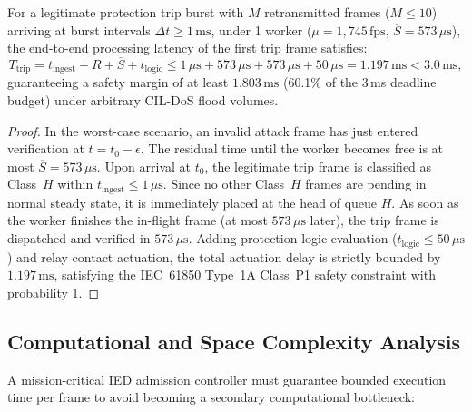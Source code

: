\documentclass{ieeeaccess}
\begin{document}
\begin{theorem}
\label{thm:deadline}
For a legitimate protection trip burst with $M$ retransmitted frames ($M \le 10$) arriving at burst intervals $\Delta t \ge 1\,\text{ms}$, under 1 worker ($\mu = 1{,}745\,\text{fps}$, $\overline{S} = 573\,\mu\text{s}$), the end-to-end processing latency of the first trip frame satisfies:
\begin{equation}
T_{\text{trip}} = t_{\text{ingest}} + R + \overline{S} + t_{\text{logic}} \le 1\,\mu\text{s} + 573\,\mu\text{s} + 573\,\mu\text{s} + 50\,\mu\text{s} = 1.197\,\text{ms} < 3.0\,\text{ms},
\end{equation}
guaranteeing a safety margin of at least $1.803\,\text{ms}$ (60.1\% of the 3\,ms deadline budget) under arbitrary CIL-DoS flood volumes.
\end{theorem}

\begin{proof}
In the worst-case scenario, an invalid attack frame has just entered verification at $t = t_0 - \epsilon$. The residual time until the worker becomes free is at most $\overline{S} = 573\,\mu\text{s}$. Upon arrival at $t_0$, the legitimate trip frame is classified as Class~$H$ within $t_{\text{ingest}} \le 1\,\mu\text{s}$. Since no other Class~$H$ frames are pending in normal steady state, it is immediately placed at the head of queue $H$. As soon as the worker finishes the in-flight frame (at most $573\,\mu\text{s}$ later), the trip frame is dispatched and verified in $573\,\mu\text{s}$. Adding protection logic evaluation ($t_{\text{logic}} \le 50\,\mu\text{s}$) and relay contact actuation, the total actuation delay is strictly bounded by $1.197\,\text{ms}$, satisfying the IEC~61850 Type~1A Class~P1 safety constraint with probability 1.
\end{proof}

\subsection{Computational and Space Complexity Analysis}
\label{sec:complexity}
A mission-critical IED admission controller must guarantee bounded execution time per frame to avoid becoming a secondary computational bottleneck:
\end{document}
